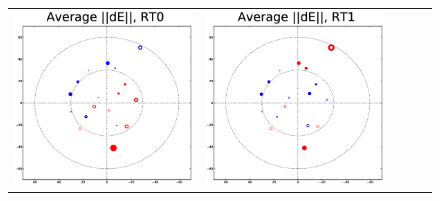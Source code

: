 \documentclass[]{article}
\begin{document}
\newlength{\roguewidth}
\setlength{\roguewidth}{.2\textwidth} 
\begin{figure}
\begin{tabular}{@{}c@{}c@{}c@{}c@{}c@{}}
\includegraphics[width=\roguewidth]{qmc2b_dE_ant0} &
\includegraphics[width=\roguewidth]{qmc2b_dE_ant1} &

\end{tabular}
\end{figure}
\end{document}

